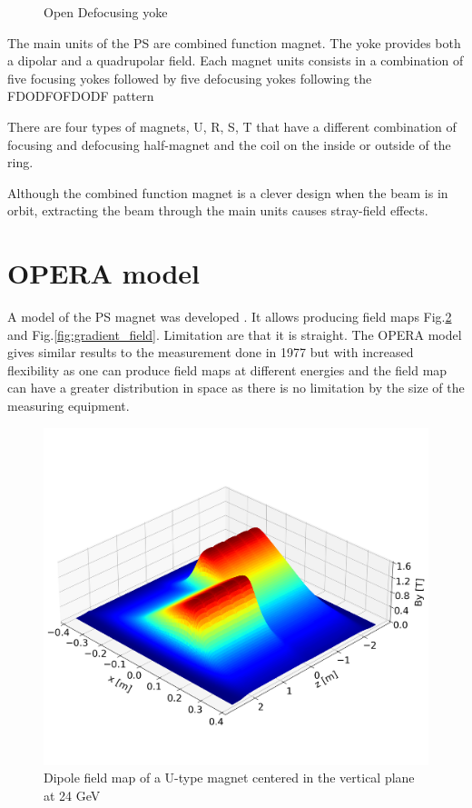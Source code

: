 \documentclass[a4paper,
               biblatex,     %
               keeplastbox,   %
               ]{jacow}
\begin{document}
\begin{figure}[!htb]
\begin{minipage}[b]{0.45\columnwidth}
    \caption{Open Defocusing yoke}
    \label{fig:defocusing}
  \end{minipage}
\end{figure}

The main units of the PS are combined function magnet. The yoke provides both a dipolar and a quadrupolar field. Each magnet units consists in a combination of five focusing yokes followed by five defocusing yokes following the FDODFOFDODF pattern \cite{}

There are four types of magnets, U, R, S, T that have a different combination of focusing and defocusing half-magnet and the coil on the inside or outside of the ring.

Although the combined function magnet is a clever design when the beam is in orbit, extracting the beam through the main units causes stray-field effects.

\section{OPERA model}
A model of the PS magnet was developed \cite{anglada_reference_nodate}. It allows producing field maps Fig.\ref{fig:dipole_field} and Fig.\ref{fig:gradient_field}. Limitation are that it is straight.
The OPERA model gives similar results to the measurement done in 1977 \cite{manglunki_beam_1997} but with increased flexibility as one can produce field maps at different energies and the field map can have a greater distribution in space as there is no limitation by the size of the measuring equipment.

\begin{figure}[!htb]
   \centering
   \includegraphics*[width=1.0\columnwidth, trim={0 2.9cm 0 4cm},clip]{dipole_field.png}
   \caption{Dipole field map of a U-type magnet centered in the vertical plane at 24 GeV}
   \label{fig:dipole_field}
\end{figure}
\end{document}
